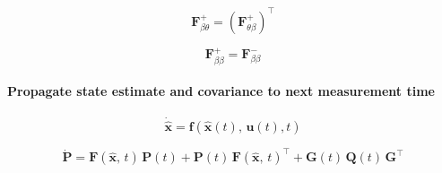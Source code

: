 \documentclass{article}
\begin{document}
$$
  \bm{F}^{+}_{\beta\theta} = \left( \bm{F}_{\theta\beta}^{+} \right)^{\intercal}
$$

$$
  \bm{F}_{\beta\beta}^{+} = \bm{F}_{\beta\beta}^{-}
$$

\paragraph{Propagate state estimate and covariance to next measurement time}

$$
  \dot{\hat{\bm{x}}} = \bm{f}\left(\hat{\bm{x}}(t),\, \bm{u}(t), t\right)
$$

$$
  \dot{\bm{P}} = \bm{F}(\hat{\bm{x}},\, t)\,\bm{P}(t) + \bm{P}(t)\,\bm{F}(\hat{\bm{x}},\, t)^{\intercal} + \bm{G}(t)\,\bm{Q}(t)\,\bm{G}^{\intercal}
$$
\end{document}
